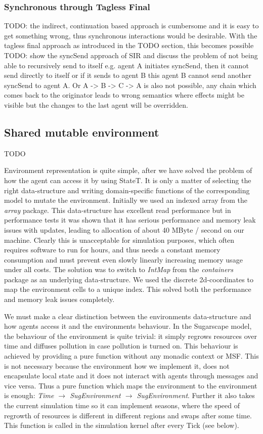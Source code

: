 \subsubsection{Synchronous through Tagless Final}
TODO: the indirect, continuation based approach is cumbersome and it is easy to get something wrong, thus synchronous interactions would be desirable. With the tagless final approach as introduced in the TODO section, this becomes possible
TODO: show the syncSend approach of SIR and discuss the problem of not being able to recursively send to itself e.g. agent A initiates syncSend, then it cannot send directly to itself or if it sends to agent B this agent B cannot send another syncSend to agent A. Or A -> B -> C -> A is also not possible, any chain which comes back to the originator leads to wrong semantics where effects might be visible but the changes to the last agent will be overridden.

\subsection{Shared mutable environment}
TODO 

Environment representation is quite simple, after we have solved the problem of how the agent can access it by using StateT. It is only a matter of selecting the right data-structure and writing domain-specific functions of the corresponding model to mutate the environment. Initially we used an indexed array from the \textit{array} package. This data-structure has excellent read performance but in performance tests it was shown that it has serious performance and memory leak issues with updates, leading to allocation of about 40 MByte / second on our machine. Clearly this is unacceptable for simulation purposes, which often requires software to run for hours, and thus needs a constant memory consumption and must prevent even slowly linearly increasing memory usage under all costs. The solution was to switch to \textit{IntMap} from the \textit{containers} package as an underlying data-structure. We used the discrete 2d-coordinates to map the environment cells to a unique index. This solved both the performance and memory leak issues completely.

We must make a clear distinction between the environments data-structure and how agents access it and the environments behaviour. In the Sugarscape model, the behaviour of the environment is quite trivial: it simply regrows resources over time and diffuses pollution in case pollution is turned on. This behaviour is achieved by providing a pure function without any monadic context or MSF. This is not necessary because the environment how we implement it, does not encapsulate local state and it does not interact with agents through messages and vice versa. Thus a pure function which maps the environment to the environment is enough: \textit{Time $\rightarrow$ SugEnvironment $\rightarrow$ SugEnvironment}. Further it also takes the current simulation time so it can implement seasons, where the speed of regrowth of resources is different in different regions and swaps after some time. This function is called in the simulation kernel after every Tick (see below).

